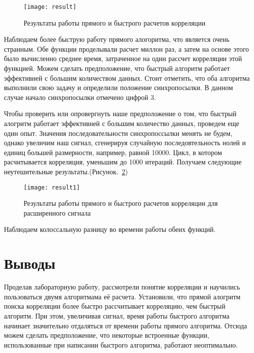 
\parindent=1cm %

\begin{figure}[H]
	\begin{center}
		\texttt{[image: result]}
		\caption{Результаты работы прямого и быстрого расчетов корреляции} 
		\label{pic:result} %
	\end{center}
\end{figure}

Наблюдаем более быструю работу прямого алогоритма, что является очень странным. Обе функции проделывали расчет миллон раз, а затем на основе этого было вычисленно среднее время, затраченное на один рассчет корреляции этой функцией. Можем сделать предположение, что быстрый алгоритм работает эффективней с большим количеством данных.
Стоит отметить, что оба алгоритма выполнили свою задачу и определили положение синхропосылки. В данном случае начало синхропосылки отмечено цифрой 3.

Чтобы проверить или опровергнуть наше предположение о том, что быстрый алогритм работает эффективней с большим количество данных, проведем еще один опыт. Значения последовательности синхропоссылки менять не будем, однако увеличим наш сигнал, сгенерируя случайную последовтельность нолей и единиц большей размерности, например, равной 10000. Цикл, в котором расчитывается корреляция, уменьшим до 1000 итераций. Получаем следующие неутешительные результаты.(Рисунок.~\ref{pic:result1})

\begin{figure}[H]
	\begin{center}
		\texttt{[image: result1]}
		\caption{Результаты работы прямого и быстрого расчетов корреляции для расширенного сигнала} 
		\label{pic:result1} %
	\end{center}
\end{figure}

Наблюдаем колоссальную разницу во времени работы обеих функций. 
\section{Выводы}
Проделав лабораторную работу, рассмотрели понятие корреляции и научились пользоваться двумя алгоритмама её расчета. Установили, что прямой алогритм поиска корреляции более быстро рассчитывает корреляцию, чем быстрый алгоритм. При этом, увеличивая сигнал, время работы быстрого алгоритма начинает значительно отдаляться от времени работы прямого алгоритма. Отсюда можем сделать предположение, что некоторые встроенные функции, использованные при написании быстрого алгоритма, работают неоптимально.




